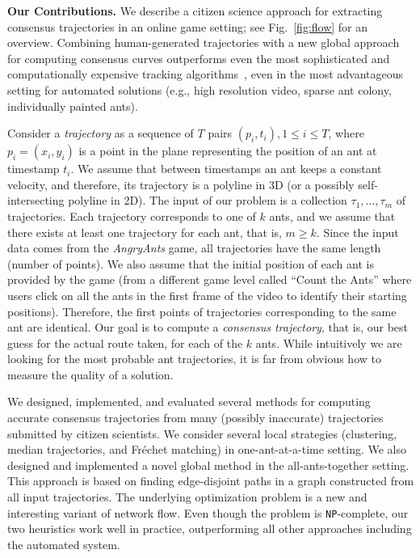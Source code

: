 \documentclass[runningheads]{llncs}
\newcommand{\blink}[1]{\textnormal{\texttt{#1}}}
\newcommand{\NPC}[0]{\blink{NP}-complete}
\newcommand{\Frechet}[0]{Fr\'{e}chet}
\begin{document}
{\bf Our Contributions.}
We describe a citizen science approach for extracting
consensus trajectories in an online game setting; see
Fig.~\ref{fig:flow} for an overview.
Combining human-generated trajectories with a new global approach for
computing consensus curves outperforms
even the most sophisticated and computationally expensive tracking algorithms~\cite{Poff12}, even in the
most advantageous setting for automated solutions (e.g., high
resolution video, sparse ant colony, individually painted ants).

Consider a {\em trajectory} as a sequence of
$T$ pairs $(p_i,t_i), 1 \le i \le T$, where $p_i=(x_i, y_i)$ is a
point in the plane representing the position of an ant at timestamp $t_i$.
We assume that between timestamps an ant keeps a constant
velocity, and therefore, its trajectory is a polyline in 3D (or a possibly
self-intersecting polyline in 2D).
The input of our problem is a collection $\tau_1, \dots, \tau_m$ of
trajectories. Each trajectory corresponds to one of $k$ ants, and we
assume that there exists at least one trajectory for each ant, that
is, $m\ge k$. Since the input data comes from the \emph{AngryAnts} game, all
trajectories have the same length (number of points).
We also assume that the initial position of each ant is provided by
the game (from a different game level called ``Count the Ants'' where
users click on all the ants in the first frame of the video to identify their starting
positions). Therefore, the first points of trajectories corresponding
to the same ant are identical. Our goal is to compute a {\em consensus
trajectory}, that is, our best guess for the actual route taken, for
each of the $k$ ants. While intuitively we are looking for the most probable ant trajectories,
it is far from obvious how to measure the quality of a solution.

We designed, implemented, and evaluated several methods for
computing accurate consensus trajectories from many (possibly
inaccurate) trajectories submitted by citizen scientists. We
consider several local strategies (clustering, median
trajectories, and \Frechet{} matching) in one-ant-at-a-time setting. We
also designed and implemented
a novel global
method in the all-ants-together setting. This approach is
based on finding edge-disjoint paths in a graph
constructed from all input trajectories. The underlying optimization
problem is a new and interesting variant of network flow. Even though
the problem is \NPC{}, our two heuristics work
well in practice, outperforming all other approaches including the
automated system.
\end{document}
